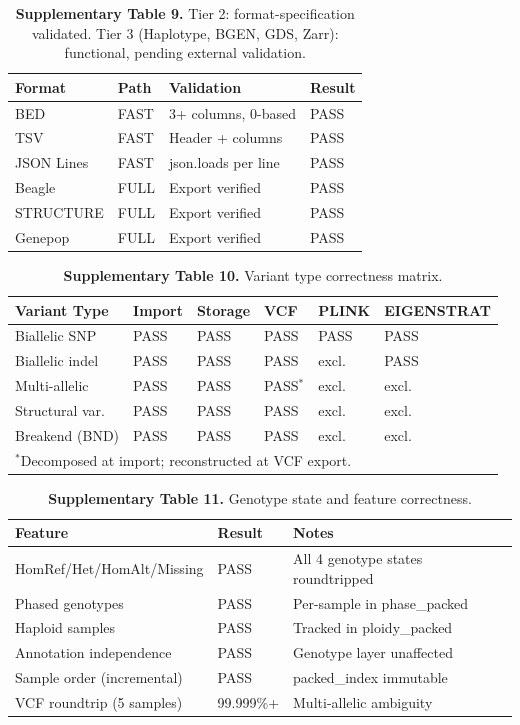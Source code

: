 \documentclass[11pt,a4paper]{article}
\begin{document}
\begin{table}[h]
\caption{\textbf{Supplementary Table 9.} Tier 2: format-specification validated. Tier 3 (Haplotype, BGEN, GDS, Zarr): functional, pending external validation.}
\begin{tabular}{@{}llll@{}}
\toprule
Format & Path & Validation & Result \\
\midrule
BED & FAST & 3+ columns, 0-based & PASS \\
TSV & FAST & Header + columns & PASS \\
JSON Lines & FAST & json.loads per line & PASS \\
Beagle & FULL & Export verified & PASS \\
STRUCTURE & FULL & Export verified & PASS \\
Genepop & FULL & Export verified & PASS \\
\bottomrule
\end{tabular}
\end{table}

\begin{table}[h]
\caption{\textbf{Supplementary Table 10.} Variant type correctness matrix.}
\begin{tabular}{@{}llllll@{}}
\toprule
Variant Type & Import & Storage & VCF & PLINK & EIGENSTRAT \\
\midrule
Biallelic SNP & PASS & PASS & PASS & PASS & PASS \\
Biallelic indel & PASS & PASS & PASS & excl. & PASS \\
Multi-allelic & PASS & PASS & PASS$^{*}$ & excl. & excl. \\
Structural var. & PASS & PASS & PASS & excl. & excl. \\
Breakend (BND) & PASS & PASS & PASS & excl. & excl. \\
\bottomrule
\multicolumn{6}{l}{\footnotesize $^{*}$Decomposed at import; reconstructed at VCF export.}
\end{tabular}
\end{table}

\begin{table}[h]
\caption{\textbf{Supplementary Table 11.} Genotype state and feature correctness.}
\begin{tabular}{@{}lll@{}}
\toprule
Feature & Result & Notes \\
\midrule
HomRef/Het/HomAlt/Missing & PASS & All 4 genotype states roundtripped \\
Phased genotypes & PASS & Per-sample in phase\_packed \\
Haploid samples & PASS & Tracked in ploidy\_packed \\
Annotation independence & PASS & Genotype layer unaffected \\
Sample order (incremental) & PASS & packed\_index immutable \\
VCF roundtrip (5 samples) & 99.999\%+ & Multi-allelic ambiguity \\
\bottomrule
\end{tabular}
\end{table}
\end{document}
